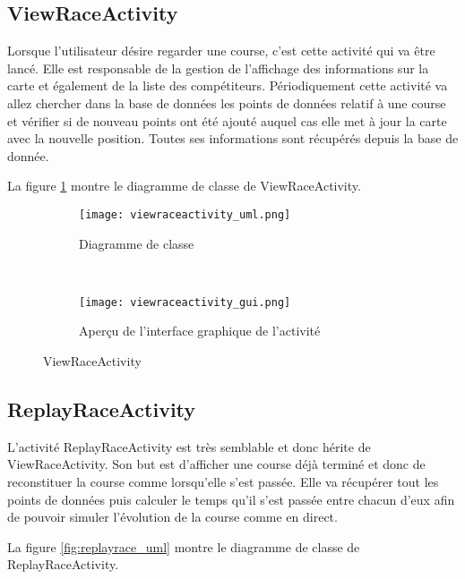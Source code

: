\subsection{ViewRaceActivity}

Lorsque l'utilisateur désire regarder une course, c'est cette activité qui va être lancé. Elle est responsable de la gestion de l'affichage des informations sur la carte et également de la liste des compétiteurs. Périodiquement cette activité va allez chercher dans la base de données les points de données relatif à une course et vérifier si de nouveau points ont été ajouté auquel cas elle met à jour la carte avec la nouvelle position. Toutes ses informations sont récupérés depuis la base de donnée.

La figure \ref{fig:viewraceactivity_uml} montre le diagramme de classe de ViewRaceActivity.

\begin{figure}[htb!]
    \centering
    \begin{subfigure}[htb]{0.49\textwidth}
		\texttt{[image: viewraceactivity\_uml.png]} 
		\caption{Diagramme de classe}
		\label{fig:viewraceactivity_uml}
    \end{subfigure}
    ~ %
    \begin{subfigure}[htb]{0.49\textwidth}
		\texttt{[image: viewraceactivity\_gui.png]} 
		\caption{Aperçu de l'interface graphique de l'activité}
		\label{fig:viewraceactivity_gui}
    \end{subfigure}
    \caption{ViewRaceActivity}\label{fig:viewraceactivity_fig}
\end{figure}

\subsection{ReplayRaceActivity}

L'activité ReplayRaceActivity est très semblable et donc hérite de ViewRaceActivity. Son but est d'afficher une course déjà terminé et donc de reconstituer la course comme lorsqu'elle s'est passée. Elle va récupérer tout les points de données puis calculer le temps qu'il s'est passée entre chacun d'eux afin de pouvoir simuler l'évolution de la course comme en direct.

La figure \ref{fig:replayrace_uml} montre le diagramme de classe de ReplayRaceActivity.

